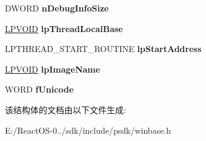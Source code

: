 \begin{DoxyCompactItemize}
D\+W\+O\+RD {\bfseries n\+Debug\+Info\+Size}
\item 
\mbox{\label{struct___c_r_e_a_t_e___p_r_o_c_e_s_s___d_e_b_u_g___i_n_f_o_aac799e3703924cf401ab5272c199be76}} 
\hyperlink{interfacevoid}{L\+P\+V\+O\+ID} {\bfseries lp\+Thread\+Local\+Base}
\item 
\mbox{\label{struct___c_r_e_a_t_e___p_r_o_c_e_s_s___d_e_b_u_g___i_n_f_o_ae46301473cbf6a7f7242f2f3ee4f4506}} 
L\+P\+T\+H\+R\+E\+A\+D\+\_\+\+S\+T\+A\+R\+T\+\_\+\+R\+O\+U\+T\+I\+NE {\bfseries lp\+Start\+Address}
\item 
\mbox{\label{struct___c_r_e_a_t_e___p_r_o_c_e_s_s___d_e_b_u_g___i_n_f_o_aea5152c240711087d77998ec3112144a}} 
\hyperlink{interfacevoid}{L\+P\+V\+O\+ID} {\bfseries lp\+Image\+Name}
\item 
\mbox{\label{struct___c_r_e_a_t_e___p_r_o_c_e_s_s___d_e_b_u_g___i_n_f_o_afcd3bd43944532df9badf70a487f0255}} 
W\+O\+RD {\bfseries f\+Unicode}
\end{DoxyCompactItemize}


该结构体的文档由以下文件生成\+:\begin{DoxyCompactItemize}
\item 
E\+:/\+React\+O\+S-\/0../sdk/include/psdk/winbase.\+h\end{DoxyCompactItemize}
